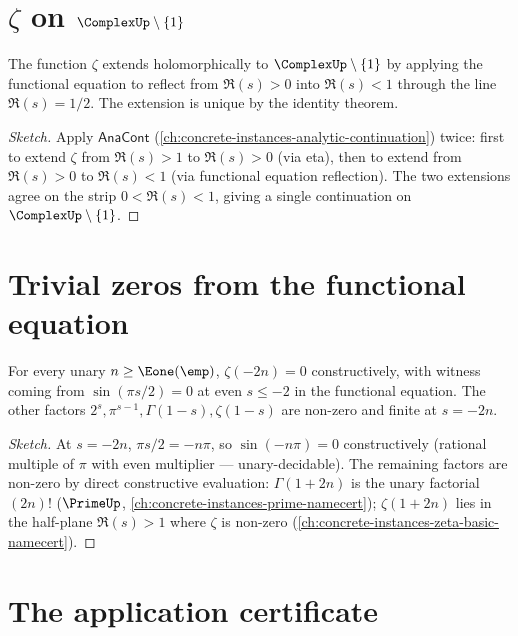 \section{\(\zeta\) on \(\ComplexUp \setminus \{1\}\)}

\begin{theorem}
\label{thm:zeta-full-continuation}
The function \(\zeta\) extends holomorphically to \(\ComplexUp \setminus \{1\}\) by applying the functional equation to reflect from \(\Re(s) > 0\) into \(\Re(s) < 1\) through the line \(\Re(s) = 1/2\). The extension is unique by the identity theorem.
\end{theorem}
\begin{proof}[Sketch]
Apply \(\mathsf{AnaCont}\) (\autoref{ch:concrete-instances-analytic-continuation}) twice: first to extend \(\zeta\) from \(\Re(s) > 1\) to \(\Re(s) > 0\) (via eta), then to extend from \(\Re(s) > 0\) to \(\Re(s) < 1\) (via functional equation reflection). The two extensions agree on the strip \(0 < \Re(s) < 1\), giving a single continuation on \(\ComplexUp \setminus \{1\}\).
\end{proof}

\section{Trivial zeros from the functional equation}

\begin{theorem}
\label{thm:trivial-zeros-witness}
For every unary \(n \geq \Eone(\emp)\), \(\zeta(-2n) = 0\) constructively, with witness coming from \(\sin(\pi s / 2) = 0\) at even \(s \leq -2\) in the functional equation. The other factors \(2^s, \pi^{s-1}, \Gamma(1 - s), \zeta(1 - s)\) are non-zero and finite at \(s = -2n\).
\end{theorem}
\begin{proof}[Sketch]
At \(s = -2n\), \(\pi s / 2 = -n\pi\), so \(\sin(-n\pi) = 0\) constructively (rational multiple of \(\pi\) with even multiplier --- unary-decidable). The remaining factors are non-zero by direct constructive evaluation: \(\Gamma(1 + 2n)\) is the unary factorial \((2n)!\) (\(\PrimeUp\), \autoref{ch:concrete-instances-prime-namecert}); \(\zeta(1 + 2n)\) lies in the half-plane \(\Re(s) > 1\) where \(\zeta\) is non-zero (\autoref{ch:concrete-instances-zeta-basic-namecert}).
\end{proof}

\section{The application certificate}

